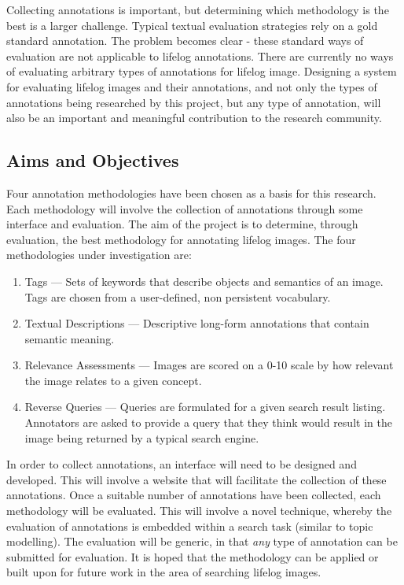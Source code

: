 \documentclass[12pt,a4paper]{article}
\begin{document}
Collecting annotations is important, but determining which methodology is the best is a larger challenge. Typical textual evaluation strategies rely on a gold standard annotation. The problem becomes clear - these standard ways of evaluation are not applicable to lifelog annotations. There are currently no ways of evaluating arbitrary types of annotations for lifelog image. Designing a system for evaluating lifelog images and their annotations, and not only the types of annotations being researched by this project, but any type of annotation, will also be an important and meaningful contribution to the research community. 

\subsection{Aims and Objectives}

Four annotation methodologies have been chosen as a basis for this research. Each methodology will involve the collection of annotations through some interface and evaluation. The aim of the project is to determine, through evaluation, the best methodology for annotating lifelog images. The four methodologies under investigation are: 

\begin{enumerate}
    \item Tags --- Sets of keywords that describe objects and semantics of an image. Tags are chosen from a user-defined, non persistent vocabulary.
    \item Textual Descriptions --- Descriptive long-form annotations that contain semantic meaning.
    \item Relevance Assessments --- Images are scored on a 0-10 scale by how relevant the image relates to a given concept.
    \item Reverse Queries --- Queries are formulated for a given search result listing. Annotators are asked to provide a query that they think would result in the image being returned by a typical search engine.
\end{enumerate}

In order to collect annotations, an interface will need to be designed and developed. This will involve a website that will facilitate the collection of these annotations. Once a suitable number of annotations have been collected, each methodology will be evaluated. This will involve a novel technique, whereby the evaluation of annotations is embedded within a search task (similar to topic modelling). The evaluation will be generic, in that \textit{any} type of annotation can be submitted for evaluation. It is hoped that the methodology can be applied or built upon for future work in the area of searching lifelog images.
\end{document}
